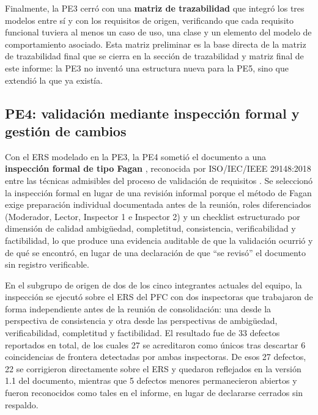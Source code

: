 \documentclass[journal,onecolumn]{IEEEtran}
\begin{document}
Finalmente, la PE3 cerró con una \textbf{matriz de trazabilidad} que integró los tres
modelos entre sí y con los requisitos de origen, verificando que cada requisito funcional
tuviera al menos un caso de uso, una clase y un elemento del modelo de comportamiento
asociado. Esta matriz preliminar es la base directa de la matriz de trazabilidad final que
se cierra en la sección de trazabilidad y matriz final de este informe: la PE3 no inventó
una estructura nueva para la PE5, sino que extendió la que ya existía.

\newpage

\subsection{PE4: validación mediante inspección formal y gestión de cambios}

Con el ERS modelado en la PE3, la PE4 sometió el documento a una \textbf{inspección formal
	de tipo Fagan} \cite{fagan1976}, reconocida por ISO/IEC/IEEE 29148:2018 entre las técnicas
admisibles del proceso de validación de requisitos \cite{ieee29148}. Se seleccionó la
inspección formal en lugar de una revisión informal porque el método de Fagan exige
preparación individual documentada antes de la reunión, roles diferenciados (Moderador,
Lector, Inspector 1 e Inspector 2) y un checklist estructurado por dimensión de calidad
 ambigüedad, completitud, consistencia, verificabilidad y factibilidad, lo que produce
una evidencia auditable de que la validación ocurrió y de qué se encontró, en lugar de una
declaración de que ``se revisó'' el documento sin registro verificable.

En el subgrupo de origen de dos de los cinco integrantes actuales del equipo, la inspección
se ejecutó sobre el ERS del PFC con dos inspectoras que trabajaron de forma independiente
antes de la reunión de consolidación: una desde la perspectiva de consistencia y otra desde
las perspectivas de ambigüedad, verificabilidad, completitud y factibilidad. El resultado
fue de 33 defectos
reportados en total, de los cuales 27 se acreditaron como únicos tras descartar 6
coincidencias de frontera detectadas por ambas inspectoras. De esos 27 defectos, 22 se
corrigieron directamente sobre el ERS y quedaron reflejados en la versión 1.1 del
documento, mientras que 5 defectos menores permanecieron abiertos y fueron reconocidos como
tales en el informe, en lugar de declararse cerrados sin respaldo. 
\end{document}
